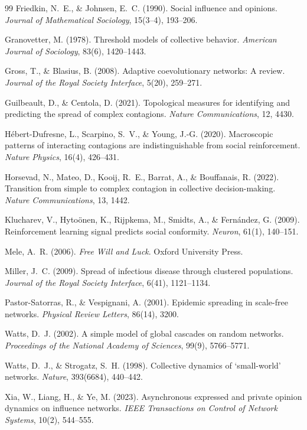 \documentclass[11pt, a4paper]{article}
\begin{document}
\begin{thebibliography}{99}
Friedkin, N.~E., \& Johnsen, E.~C. (1990).
Social influence and opinions.
\textit{Journal of Mathematical Sociology}, 15(3--4), 193--206.

Granovetter, M. (1978).
Threshold models of collective behavior.
\textit{American Journal of Sociology}, 83(6), 1420--1443.

Gross, T., \& Blasius, B. (2008).
Adaptive coevolutionary networks: A review.
\textit{Journal of the Royal Society Interface}, 5(20), 259--271.

Guilbeault, D., \& Centola, D. (2021).
Topological measures for identifying and predicting the spread of complex contagions.
\textit{Nature Communications}, 12, 4430.

H\'{e}bert-Dufresne, L., Scarpino, S.~V., \& Young, J.-G. (2020).
Macroscopic patterns of interacting contagions are indistinguishable from social reinforcement.
\textit{Nature Physics}, 16(4), 426--431.

Horsevad, N., Mateo, D., Kooij, R.~E., Barrat, A., \& Bouffanais, R. (2022).
Transition from simple to complex contagion in collective decision-making.
\textit{Nature Communications}, 13, 1442.

Klucharev, V., Hyto\"{o}nen, K., Rijpkema, M., Smidts, A., \& Fern\'{a}ndez, G. (2009).
Reinforcement learning signal predicts social conformity.
\textit{Neuron}, 61(1), 140--151.

Mele, A.~R. (2006).
\textit{Free Will and Luck}.
Oxford University Press.

Miller, J.~C. (2009).
Spread of infectious disease through clustered populations.
\textit{Journal of the Royal Society Interface}, 6(41), 1121--1134.

Pastor-Satorras, R., \& Vespignani, A. (2001).
Epidemic spreading in scale-free networks.
\textit{Physical Review Letters}, 86(14), 3200.

Watts, D.~J. (2002).
A simple model of global cascades on random networks.
\textit{Proceedings of the National Academy of Sciences}, 99(9), 5766--5771.

Watts, D.~J., \& Strogatz, S.~H. (1998).
Collective dynamics of `small-world' networks.
\textit{Nature}, 393(6684), 440--442.

Xia, W., Liang, H., \& Ye, M. (2023).
Asynchronous expressed and private opinion dynamics on influence networks.
\textit{IEEE Transactions on Control of Network Systems}, 10(2), 544--555.

\end{thebibliography}
\end{document}
